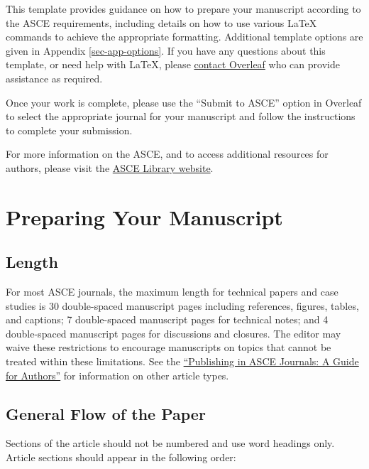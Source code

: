 \documentclass[
  NewProceedings,
  letterpaper]{./assets/ascelike-new}
\begin{document}
This template provides guidance on how to prepare your manuscript
according to the ASCE requirements, including details on how to use
various LaTeX commands to achieve the appropriate formatting. Additional
template options are given in Appendix \ref{sec-app-options}. If you
have any questions about this template, or need help with LaTeX, please
\href{https://www.overleaf.com/contact}{contact Overleaf} who can
provide assistance as required.

Once your work is complete, please use the ``Submit to ASCE'' option in
Overleaf to select the appropriate journal for your manuscript and
follow the instructions to complete your submission.

For more information on the ASCE, and to access additional resources for
authors, please visit the
\href{http://ascelibrary.org/page/authors}{ASCE Library website}.

\hypertarget{preparing-your-manuscript}{%
\section{Preparing Your Manuscript}\label{preparing-your-manuscript}}

\hypertarget{length}{%
\subsection{Length}\label{length}}

For most ASCE journals, the maximum length for technical papers and case
studies is 30 double-spaced manuscript pages including references,
figures, tables, and captions; 7 double-spaced manuscript pages for
technical notes; and 4 double-spaced manuscript pages for discussions
and closures. The editor may waive these restrictions to encourage
manuscripts on topics that cannot be treated within these limitations.
See the
\href{https://ascelibrary.org/doi/pdf/10.1061/9780784479018}{``Publishing
in ASCE Journals: A Guide for Authors''} for information on other
article types.

\hypertarget{general-flow-of-the-paper}{%
\subsection{General Flow of the Paper}\label{general-flow-of-the-paper}}

Sections of the article should not be numbered and use word headings
only. Article sections should appear in the following order:
\end{document}
